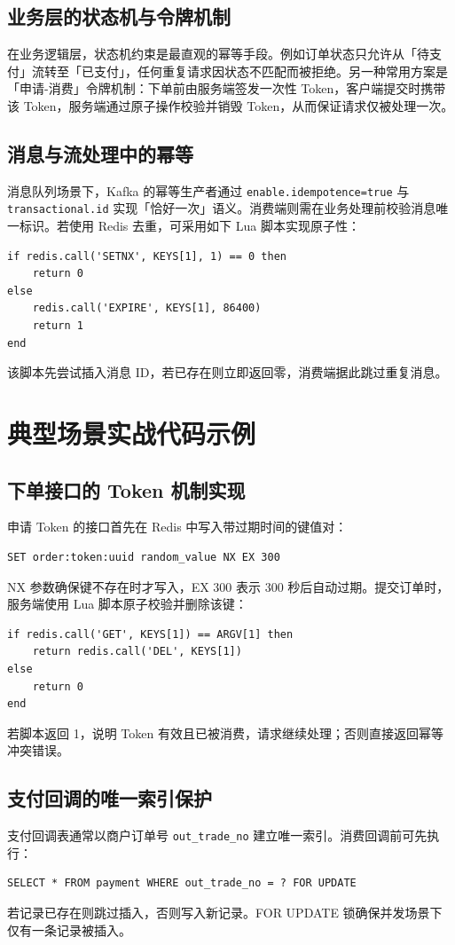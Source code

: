 \section{业务层的状态机与令牌机制}
在业务逻辑层，状态机约束是最直观的幂等手段。例如订单状态只允许从「待支付」流转至「已支付」，任何重复请求因状态不匹配而被拒绝。另一种常用方案是「申请-消费」令牌机制：下单前由服务端签发一次性 Token，客户端提交时携带该 Token，服务端通过原子操作校验并销毁 Token，从而保证请求仅被处理一次。\par
\section{消息与流处理中的幂等}
消息队列场景下，Kafka 的幂等生产者通过 \texttt{enable.idempotence=true} 与 \texttt{transactional.id} 实现「恰好一次」语义。消费端则需在业务处理前校验消息唯一标识。若使用 Redis 去重，可采用如下 Lua 脚本实现原子性：\par
\begin{lstlisting}
if redis.call('SETNX', KEYS[1], 1) == 0 then
    return 0
else
    redis.call('EXPIRE', KEYS[1], 86400)
    return 1
end
\end{lstlisting}
该脚本先尝试插入消息 ID，若已存在则立即返回零，消费端据此跳过重复消息。\par
\chapter{典型场景实战代码示例}
\section{下单接口的 Token 机制实现}
申请 Token 的接口首先在 Redis 中写入带过期时间的键值对：\par
\begin{lstlisting}
SET order:token:uuid random_value NX EX 300
\end{lstlisting}
NX 参数确保键不存在时才写入，EX 300 表示 300 秒后自动过期。提交订单时，服务端使用 Lua 脚本原子校验并删除该键：\par
\begin{lstlisting}
if redis.call('GET', KEYS[1]) == ARGV[1] then
    return redis.call('DEL', KEYS[1])
else
    return 0
end
\end{lstlisting}
若脚本返回 1，说明 Token 有效且已被消费，请求继续处理；否则直接返回幂等冲突错误。\par
\section{支付回调的唯一索引保护}
支付回调表通常以商户订单号 \texttt{out\_{}trade\_{}no} 建立唯一索引。消费回调前可先执行：\par
\begin{lstlisting}
SELECT * FROM payment WHERE out_trade_no = ? FOR UPDATE
\end{lstlisting}
若记录已存在则跳过插入，否则写入新记录。FOR UPDATE 锁确保并发场景下仅有一条记录被插入。\par
